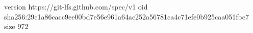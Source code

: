 version https://git-lfs.github.com/spec/v1
oid sha256:29c1a86cacc9ee00bd7e56e961a64ac252a56781ca4c71efe0b925caa051fbc7
size 972
